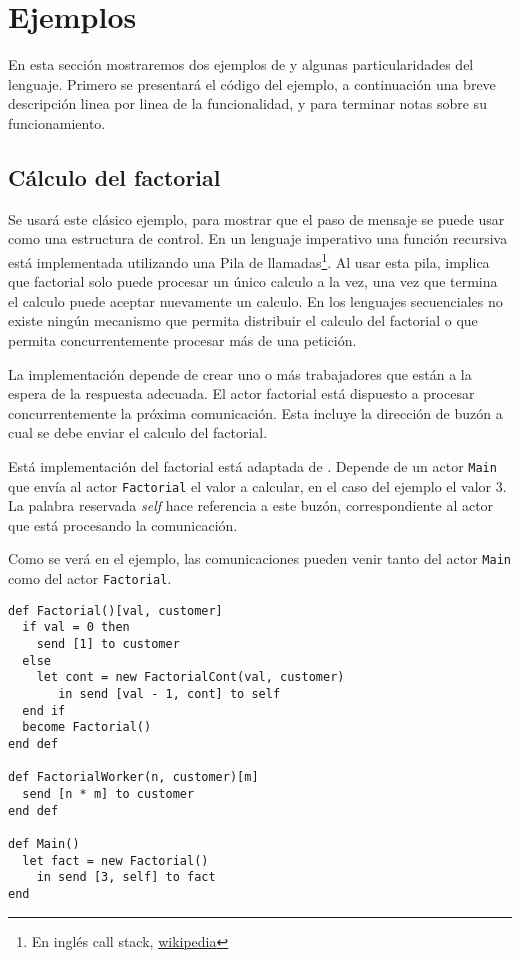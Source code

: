 \section{Ejemplos}

En esta sección mostraremos dos ejemplos de \SAL y algunas particularidades del lenguaje. Primero se presentará el código del ejemplo, a continuación una breve descripción linea por linea de la funcionalidad, y para terminar notas sobre su funcionamiento.

\subsection{Cálculo del factorial}\label{sal:factorial}

Se usará este clásico ejemplo, para mostrar que el paso de mensaje se puede usar como una estructura de control. En un lenguaje imperativo una función recursiva está implementada utilizando una Pila de llamadas\footnote{En inglés call stack, \href{https://es.wikipedia.org/wiki/Pila_de_llamadas}{wikipedia}}. Al usar esta pila, implica que factorial solo puede procesar un único calculo a la vez, una vez que termina el calculo puede aceptar nuevamente un calculo. En los lenguajes secuenciales no existe ningún mecanismo que permita distribuir el calculo del factorial o que permita concurrentemente procesar más de una petición.

La implementación depende de crear uno o más trabajadores que están a la espera de la respuesta adecuada. El actor factorial está dispuesto a procesar concurrentemente la próxima comunicación. Esta incluye la dirección de buzón a cual se debe enviar el calculo del factorial.

Está implementación del factorial está adaptada de \cite{Agha:1986:AMC:7929}. Depende de un actor \lstinline[language=sal, style=simple]$Main$ que envía al actor \lstinline[language=sal, style=simple]$Factorial$ el valor a calcular, en el caso del ejemplo el valor $3$. La palabra reservada \textit{self} hace referencia a este buzón, correspondiente al actor que está procesando la comunicación.

Como se verá en el ejemplo, las comunicaciones pueden venir tanto del actor \lstinline[language=sal, style=simple]$Main$ como del actor \lstinline[language=sal, style=simple]$Factorial$.

\begin{lstlisting}[language=sal, style=simple]
def Factorial()[val, customer]
  if val = 0 then
    send [1] to customer
  else
    let cont = new FactorialCont(val, customer)
       in send [val - 1, cont] to self
  end if 
  become Factorial()
end def

def FactorialWorker(n, customer)[m] 
  send [n * m] to customer
end def

def Main() 
  let fact = new Factorial() 
    in send [3, self] to fact
end
\end{lstlisting}

